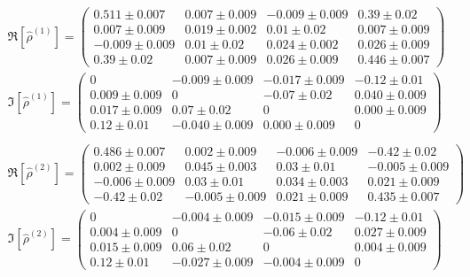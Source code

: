 \documentclass[a4paper, 11pt]{article}
\begin{document}
      \begin{gather*}
        \Re[\hat{\rho}^{(1)}] =
        \begin{pmatrix}
          0.511 \pm 0.007 & 0.007 \pm 0.009 & -0.009 \pm 0.009 & 0.39 \pm 0.02 \\
          0.007 \pm 0.009 & 0.019 \pm 0.002 & 0.01 \pm 0.02 & 0.007 \pm 0.009 \\
          -0.009 \pm 0.009 & 0.01 \pm 0.02 & 0.024 \pm 0.002 & 0.026 \pm 0.009 \\
          0.39 \pm 0.02 & 0.007 \pm 0.009 & 0.026 \pm 0.009 & 0.446 \pm 0.007
        \end{pmatrix}
        \\
        \Im[\hat{\rho}^{(1)}] =
        \begin{pmatrix}
          0 & -0.009 \pm 0.009 & -0.017 \pm 0.009 & -0.12 \pm 0.01 \\
          0.009 \pm 0.009 & 0 & -0.07 \pm 0.02 & 0.040 \pm 0.009 \\
          0.017 \pm 0.009 & 0.07 \pm 0.02 & 0 & 0.000 \pm 0.009 \\
          0.12 \pm 0.01 & -0.040 \pm 0.009 & 0.000 \pm 0.009 & 0
        \end{pmatrix}
        \\
        \\
        \Re[\hat{\rho}^{(2)}] =
        \begin{pmatrix}
          0.486 \pm 0.007 & 0.002 \pm 0.009 & -0.006 \pm 0.009 & -0.42 \pm 0.02 \\
          0.002 \pm 0.009 & 0.045 \pm 0.003 & 0.03 \pm 0.01 & -0.005 \pm 0.009 \\
          -0.006 \pm 0.009 & 0.03 \pm 0.01 & 0.034 \pm 0.003 & 0.021 \pm 0.009 \\
          -0.42 \pm 0.02 & -0.005 \pm 0.009 & 0.021 \pm 0.009 & 0.435 \pm 0.007
        \end{pmatrix}
        \\
        \Im[\hat{\rho}^{(2)}] =
        \begin{pmatrix}
          0 & -0.004 \pm 0.009 & -0.015 \pm 0.009 & -0.12 \pm 0.01 \\
          0.004 \pm 0.009 & 0 & -0.06 \pm 0.02 & 0.027 \pm 0.009 \\
          0.015 \pm 0.009 & 0.06 \pm 0.02 & 0 & 0.004 \pm 0.009 \\
          0.12 \pm 0.01 & -0.027 \pm 0.009 & -0.004 \pm 0.009 & 0
        \end{pmatrix}
        \\

\end{gather*}
\end{document}
